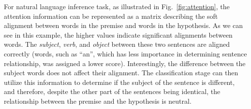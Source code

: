 For natural language inference task, as illustrated in Fig.~\ref{fig:attention}, the attention information can be represented as a matrix describing the soft alignment between words in the premise and words in the hypothesis. As we can see in this example, the higher values indicate significant alignments between words. The \emph{subject}, \emph{verb}, and \emph{object} between these two sentences are aligned correctly (words, such as ``an'', which has less importance in determining sentence relationship, was assigned a lower score). Interestingly, the difference between the subject words does not affect their alignment. The classification stage can then utilize this information to determine if the subject of the sentence is different, and therefore, despite the other part of the sentences being identical, the relationship between the premise and the hypothesis is neutral.



